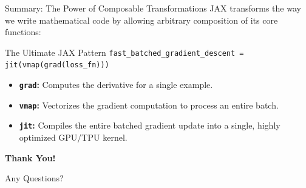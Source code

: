\documentclass[aspectratio=169]{beamer}
\begin{document}
\begin{frame}{Summary: The Power of Composable Transformations}
    JAX transforms the way we write mathematical code by allowing arbitrary composition of its core functions:

    \vspace{0.3cm}
    \begin{block}{The Ultimate JAX Pattern}
        \centering
        \texttt{fast\_batched\_gradient\_descent = jit(vmap(grad(loss\_fn)))}
    \end{block}

    \vspace{0.3cm}
    \begin{itemize}
        \item \textbf{\texttt{grad}:} Computes the derivative for a single example.
        \item \textbf{\texttt{vmap}:} Vectorizes the gradient computation to process an entire batch.
        \item \textbf{\texttt{jit}:} Compiles the entire batched gradient update into a single, highly optimized GPU/TPU kernel.
    \end{itemize}
\end{frame}

\begin{frame}
    \begin{center}
        \Huge \textbf{Thank You!}

        \vspace{1cm}
        \Large Any Questions?
    \end{center}
\end{frame}
\end{document}
